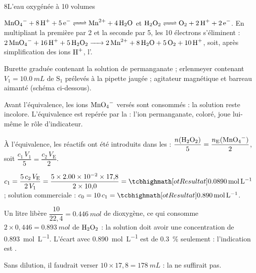 

\begin{corrigeBac}{8}{L'eau oxygénée à 10 volumes}
\begin{questions}
\item $\ce{MnO4- + 8 H+ + 5 e- <=> Mn^{2+} + 4 H2O}$ et $\ce{H2O2 <=> O2 + 2 H+ + 2 e-}$. En multipliant la première par 2 et la seconde
par 5, les 10 électrons s'éliminent : $\ce{2 MnO4- + 16 H+ + 5 H2O2 -> 2 Mn^{2+} + 8 H2O + 5 O2 + 10 H+}$, soit, après simplification
des ions $\ce{H+}$, l'. 
\item Burette graduée contenant la solution de permanganate ; erlenmeyer contenant $V_1=\qty{10,0}{mL}$ de $\mathrm{S_1}$ prélevés à la pipette
jaugée ; agitateur magnétique et barreau aimanté (schéma ci-dessous). \pts{1 pt}
\item Avant l'équivalence, les ions $\ce{MnO4-}$ versés sont consommés : la solution reste incolore. L'équivalence est repérée par la
 : l'ion permanganate, coloré, joue lui-même le rôle d'indicateur. \pts{1 pt}
\item À l'équivalence, les réactifs ont été introduits dans les  :
$\dfrac{n(\ce{H2O2})}{5}=\dfrac{n_\mathrm{E}(\ce{MnO4-})}{2}$, soit $\dfrac{c_1\,V_1}{5}=\dfrac{c_2\,V_\mathrm{E}}{2}$. \pts{1 pt}
\item $c_1=\dfrac{5\,c_2\,V_\mathrm{E}}{2\,V_1}=\dfrac{5\times\num{2,00e-2}\times17{,}8}{2\times10{,}0}=\res{\qty{0,0890}{mol.L^{-1}}}$ ; solution commerciale :
$c_0=10\,c_1=\res{\qty{0,890}{mol.L^{-1}}}$. 
\item Un litre libère $\dfrac{10}{22{,}4}=\qty{0,446}{mol}$ de dioxygène, ce qui consomme $2\times0{,}446=\qty{0,893}{mol}$ de $\ce{H2O2}$ : la solution
doit avoir une concentration de \qty{0,893}{mol.L^{-1}}. L'écart avec \qty{0,890}{mol.L^{-1}} est de \qty{0,3}{\percent} seulement :
l'indication est . 
\item Sans dilution, il faudrait verser $10\times17{,}8=\qty{178}{mL}$ : la  ne suffirait pas. 
\end{questions}
\end{corrigeBac}

